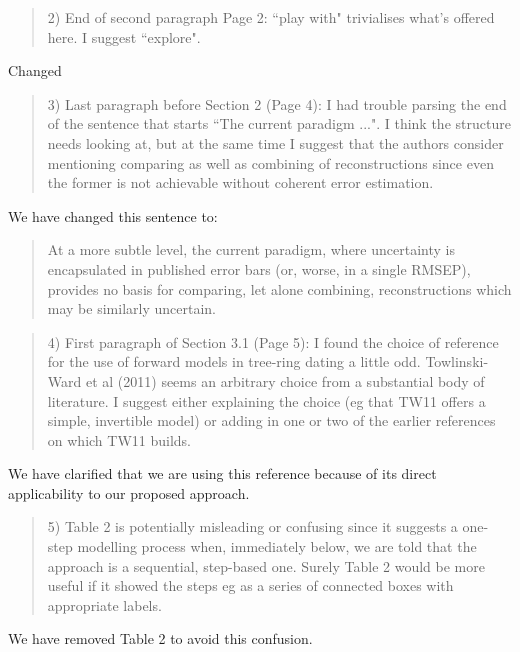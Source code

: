 \documentclass[a4paper,11pt]{article}
\begin{document}
\begin{framed} \begin{quote}
2) End of second paragraph Page 2: ``play with" trivialises what's offered here.  I suggest ``explore".
\end{quote} \end{framed}
Changed

\begin{framed} \begin{quote}
3) Last paragraph before Section 2 (Page 4): I had trouble parsing the end of the sentence that starts ``The current paradigm ...".  I think the structure needs looking at, but at the same time I suggest that the authors consider mentioning comparing as well as combining of reconstructions since even the former is not achievable without coherent error estimation.
\end{quote} \end{framed}
We have changed this sentence to:
\begin{quote}
At a more subtle level, the current paradigm, where uncertainty is encapsulated in published error bars (or, worse, in a single RMSEP), provides no basis for comparing, let alone combining, reconstructions which may be similarly uncertain.
\end{quote}

\begin{framed} \begin{quote}
4) First paragraph of Section 3.1 (Page 5): I found the choice of reference for the use of forward models in tree-ring dating a little odd. Towlinski-Ward et al (2011) seems an arbitrary choice from a substantial body of literature.  I suggest either explaining the choice (eg that TW11 offers a simple, invertible model) or adding in one or two of the earlier references on which TW11 builds.
\end{quote} \end{framed}
We have clarified that we are using this reference because of its direct applicability to our proposed approach.

\begin{framed} \begin{quote}
5) Table 2 is potentially misleading or confusing since it suggests a one-step modelling process when, immediately below, we are told that the approach is a sequential, step-based one.  Surely Table 2 would be more useful if it showed the steps eg as a series of connected boxes with appropriate labels.
\end{quote} \end{framed}
We have removed Table 2 to avoid this confusion. 
\end{document}
